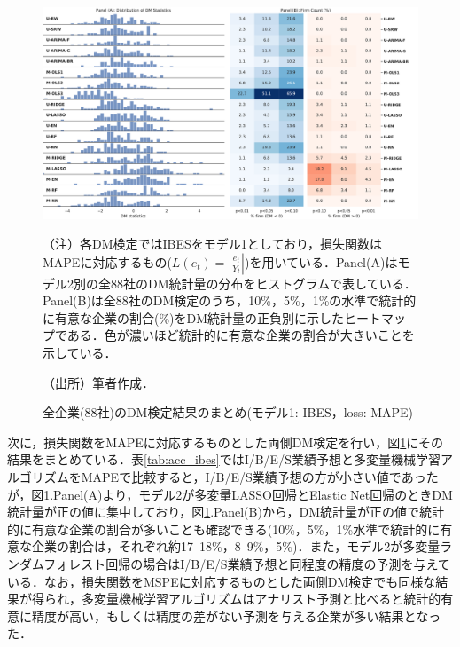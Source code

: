 \documentclass[a4paper，11pt]{jsarticle}
\begin{document}
\begin{figure}[tbp]
  \centering
  \caption{全企業(88社)のDM検定結果のまとめ(モデル1: IBES，loss: MAPE)}
  \label{fig:dm_ibes_mape}
  \includegraphics[width=\linewidth]{./img/_dm_MAPE_y_hat_ibes.pdf}
  \begin{threeparttable}
  \begin{tablenotes}
    \item[]（注）各DM検定ではIBESをモデル1としており，損失関数はMAPEに対応するもの($L(e_t)=\left|\frac{e_t}{Y_t}\right|$)を用いている．Panel(A)はモデル2別の全88社のDM統計量の分布をヒストグラムで表している．Panel(B)は全88社のDM検定のうち，10\%，5\%，1\%の水準で統計的に有意な企業の割合(\%)をDM統計量の正負別に示したヒートマップである．色が濃いほど統計的に有意な企業の割合が大きいことを示している．
    \item[]（出所）筆者作成．
  \end{tablenotes}
  \end{threeparttable}
\end{figure}

次に，損失関数をMAPEに対応するものとした両側DM検定を行い，図\ref{fig:dm_ibes_mape}にその結果をまとめている．表\ref{tab:acc_ibes}ではI/B/E/S業績予想と多変量機械学習アルゴリズムをMAPEで比較すると，I/B/E/S業績予想の方が小さい値であったが，図\ref{fig:dm_ibes_mape}.Panel(A)より，モデル2が多変量LASSO回帰とElastic Net回帰のときDM統計量が正の値に集中しており，図\ref{fig:dm_ibes_mape}.Panel(B)から，DM統計量が正の値で統計的に有意な企業の割合が多いことも確認できる(10\%，5\%，1\%水準で統計的に有意な企業の割合は，それぞれ約17~18\%，8~9\%，5\%)．また，モデル2が多変量ランダムフォレスト回帰の場合はI/B/E/S業績予想と同程度の精度の予測を与えている．なお，損失関数をMSPEに対応するものとした両側DM検定でも同様な結果が得られ，多変量機械学習アルゴリズムはアナリスト予測と比べると統計的有意に精度が高い，もしくは精度の差がない予測を与える企業が多い結果となった．
\end{document}
